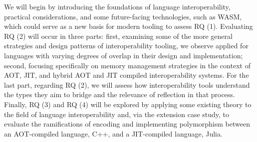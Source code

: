 We will begin by introducing the foundations of language interoperability, practical considerations, and some future-facing technologies, such as WASM, which could serve as a new basis for modern tooling to assess RQ (1). Evaluating RQ (2) will occur in three parts: first, examining some of the more general strategies and design patterns of interoperability tooling, we observe applied for languages with varying degrees of overlap in their design and implementation; second, focusing specifically on memory management strategies in the context of AOT, JIT, and hybrid AOT and JIT compiled interoperability systems. For the last part, regarding RQ (2), we will assess how interoperability tools understand the types they aim to bridge and the relevance of reflection in that process. Finally, RQ (3) and RQ (4) will be explored by applying some existing theory to the field of language interoperability and, via the extension case study, to evaluate the ramifications of encoding and implementing polymorphism between an AOT-compiled language, C++, and a JIT-compiled language, Julia. 